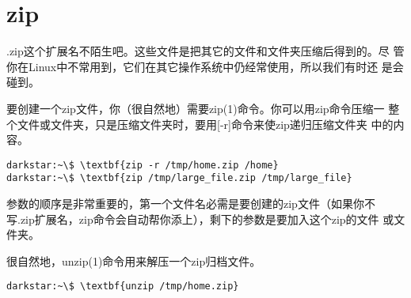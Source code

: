 \section{zip}
\label{sec:archiveFiles:zip}
.zip这个扩展名不陌生吧。这些文件是把其它的文件和文件夹压缩后得到的。尽
管你在Linux中不常用到，它们在其它操作系统中仍经常使用，所以我们有时还
是会碰到。

要创建一个zip文件，你（很自然地）需要zip(1)命令。你可以用zip命令压缩一
整个文件或文件夹，只是压缩文件夹时，要用[-r]命令来使zip递归压缩文件夹
中的内容。
\begin{Verbatim}[frame=single, commandchars=\\\{\}]
darkstar:~\$ \textbf{zip -r /tmp/home.zip /home}
darkstar:~\$ \textbf{zip /tmp/large_file.zip /tmp/large_file}
\end{Verbatim}

参数的顺序是非常重要的，第一个文件名必需是要创建的zip文件（如果你不
写.zip扩展名，zip命令会自动帮你添上），剩下的参数是要加入这个zip的文件
或文件夹。

很自然地，unzip(1)命令用来解压一个zip归档文件。
\begin{Verbatim}[frame=single, commandchars=\\\{\}]
darkstar:~\$ \textbf{unzip /tmp/home.zip}
\end{Verbatim}

